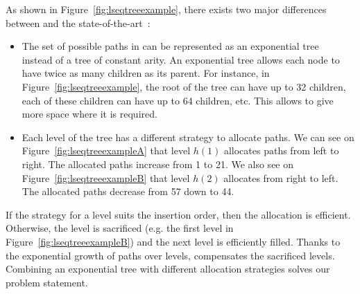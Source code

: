 As shown in Figure~\ref{fig:lseqtreeexample}, there exists two major differences
between \LSEQ and the state-of-the-art~\cite{preguica2009commutative,
  weiss2009logoot}:
\begin{itemize}
\item The set of possible paths in \LSEQ can be represented as an exponential
  tree~\cite{andersson1996faster,andersson2007dynamic} instead of a tree of
  constant arity. An exponential tree allows each node to have twice as many
  children as its parent. For instance, in Figure~\ref{fig:lseqtreeexample}, the
  root of the tree can have up to 32 children, each of these children can have
  up to 64 children, etc. This allows to give more space where it is required.
\item Each level of the tree has a different strategy to allocate paths. We can
  see on Figure~\ref{fig:lseqtreeexampleA} that level $h(1)$ allocates paths
  from left to right. The allocated paths increase from 1 to 21. We also see on
  Figure~\ref{fig:lseqtreeexampleB} that level $h(2)$ allocates from right to
  left. The allocated paths decrease from 57 down to 44.
  

\end{itemize}

If the strategy for a level suits the insertion order, then the allocation is
efficient. Otherwise, the level is sacrificed (e.g. the first level in
Figure~\ref{fig:lseqtreeexampleB}) and the next level is efficiently filled.
Thanks to the exponential growth of paths over levels, \LSEQ compensates the
sacrificed levels.  Combining an exponential tree with different allocation
strategies solves our problem statement.


